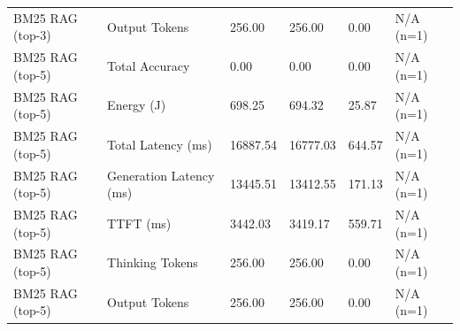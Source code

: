 \begin{table}
\begin{tabular}{llllll}
BM25 RAG (top-3) & Output Tokens & 256.00 & 256.00 & 0.00 & N/A (n=1) \\
BM25 RAG (top-5) & Total Accuracy & 0.00 & 0.00 & 0.00 & N/A (n=1) \\
BM25 RAG (top-5) & Energy (J) & 698.25 & 694.32 & 25.87 & N/A (n=1) \\
BM25 RAG (top-5) & Total Latency (ms) & 16887.54 & 16777.03 & 644.57 & N/A (n=1) \\
BM25 RAG (top-5) & Generation Latency (ms) & 13445.51 & 13412.55 & 171.13 & N/A (n=1) \\
BM25 RAG (top-5) & TTFT (ms) & 3442.03 & 3419.17 & 559.71 & N/A (n=1) \\
BM25 RAG (top-5) & Thinking Tokens & 256.00 & 256.00 & 0.00 & N/A (n=1) \\
BM25 RAG (top-5) & Output Tokens & 256.00 & 256.00 & 0.00 & N/A (n=1) \\
\bottomrule
\end{tabular}
\end{table}
